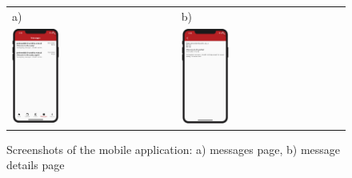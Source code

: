 \begin{figure}[htb]
    \centering
    \begin{tabular}{@{}ll@{}}
        a) & b) \\
        {\includegraphics[page=1,width=0.300\textwidth]{fig06/messages_page.png}} &
        {\includegraphics[page=7,width=0.300\textwidth]{fig06/message_details_page.png}} \\
    \end{tabular}
    \caption{Screenshots of the mobile application: a) messages page, b) message details page} \label{fig:messages-details-page}
\end{figure}
